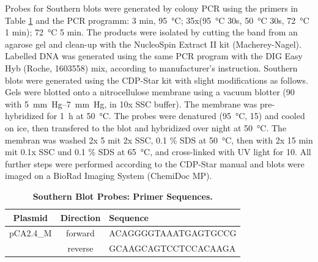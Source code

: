 \documentclass[10pt,a4]{article}
\newcommand{\remove}[1]{\begingroup\color{gray}\endgroup}
\begin{document}
Probes for Southern blots were generated by colony PCR using the
primers in Table \ref{tab:blot} and the PCR programm: 3 min,
\SI{95}{\celsius}; 35x(\SI{95}{\celsius} 30s, \SI{50}{\celsius} 30s,
\SI{72}{\celsius} 1 min); \SI{72}{\celsius} 5 min.  The products were
isolated by cutting the band from an agarose gel and clean-up with the
NucleoSpin Extract II kit (Macherey-Nagel).  Labelled DNA was
generated using the same PCR program with the DIG Easy Hyb (Roche,
1603558) mix, according to manufacturer's instruction.
%
Southern blots were generated using the CDP-Star kit with slight
modifications as follows.  Gels were blotted onto a nitrocellulose
membrane using a vacuum blotter \remove{model?} (\SI{90}{\min} with
\SIrange{5}{7}{mm Hg}, in 10x SSC buffer). The membrane was
pre-hybridized for \SI{1}{\hour} at \SI{50}{\celsius}.  The probes
were denatured (\SI{95}{\celsius}, \SI{15}{\min}) and cooled on ice,
then transfered to the blot and hybridized over night at
\SI{50}{\celsius}. The membran was washed 2x \SI{5}{\min} mit 2x SSC,
0.1 \% SDS at \SI{50}{\celsius}, then with 2x 15 min mit 0.1x SSC und
0.1 \% SDS at \SI{65}{\celsius}, and cross-linked with UV light
\remove{model} for \SI{10}{\min}. All further steps were performed
according to the CDP-Star manual and blots were imaged on a
  BioRad Imaging System (ChemiDoc MP).





\begin{table}[ht!]
  \begin{tabular}{c|c|l}
    Plasmid & Direction & Sequence \\
    \hline
    pCA2.4\_M &forward & ACAGGGGTAAATGAGTGCCG\\ %
    &reverse & GCAAGCAGTCCTCCACAAGA  %
  \end{tabular}
  \caption{\textbf{Southern Blot Probes: Primer Sequences.}}
  \label{tab:blot}
\end{table}
\end{document}
